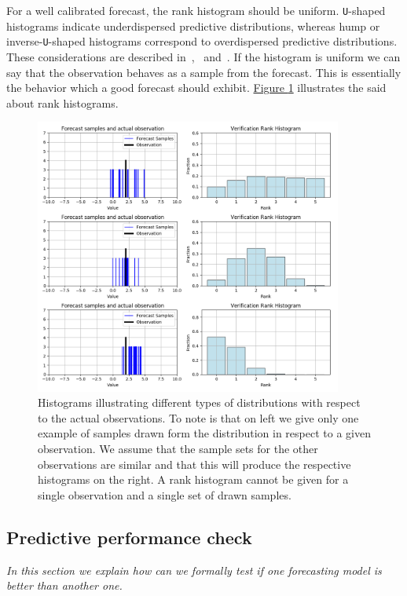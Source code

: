 \documentclass[12pt,a4paper,twoside]{scrartcl}
\numberwithin{equation}{section}
\newcommand{\reffig}[1]{\hyperref[#1]{Figure \ref*{#1}}}
\begin{document}
For a well calibrated forecast, the rank histogram should be uniform. \texttt{U}-shaped histograms indicate underdispersed predictive distributions, whereas hump or inverse-\texttt{U}-shaped histograms correspond to overdispersed predictive distributions. These considerations are described in~\cite{gneiting2014},~\cite{diebold1998} and~\cite{hamill2001}. If the histogram is uniform we can say that the observation behaves as a sample from the forecast. This is essentially the behavior which a good forecast should exhibit. \reffig{fig:rank-hist} illustrates the said about rank histograms.
\begin{center}
  \begin{figure}[H]
    \centering
    \includegraphics[height=0.75\textwidth, width=0.9\textwidth]{figures/verification_histogram.png}
    \caption[Rank Histogram Example]{Histograms illustrating different types of distributions with respect to the actual observations. To note is that on left we give only one example of samples drawn form the distribution in respect to a given observation. We assume that the sample sets for the other observations are similar and that this will produce the respective histograms on the right. A rank histogram cannot be given for a single observation and a single set of drawn samples.}\label{fig:rank-hist}
  \end{figure}
\end{center}
\subsection{Predictive performance check}\label{sec:pred-check}
\noindent\emph{In this section we explain how can we formally test if one forecasting model is better than another one.}
\end{document}
